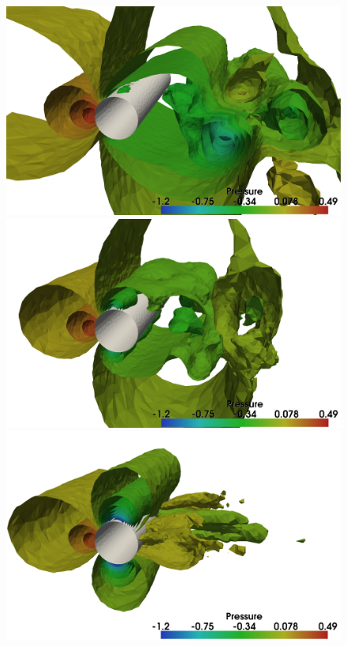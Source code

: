 \begin{figure}
  \centering
  \includegraphics[width=\twofigs]{chapters/hoffman-1/png/Hoffman_fig3a.png}
  \includegraphics[width=\twofigs]{chapters/hoffman-1/png/Hoffman_fig3b.png} \\
  \includegraphics[width=\twofigs]{chapters/hoffman-1/png/Hoffman_fig3c.png}

\end{figure}
